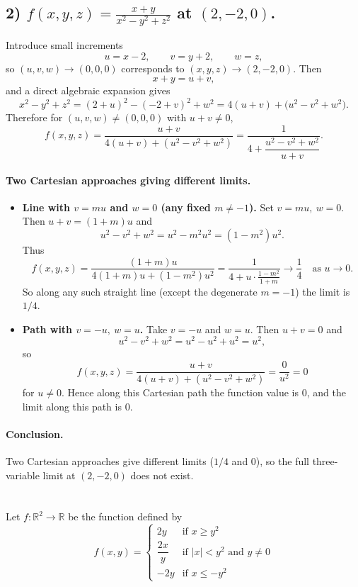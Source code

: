\documentclass[12pt]{article}
\begin{document}
\begin{correctionbox}
\subsection*{2) \(\displaystyle f(x,y,z)=\frac{x+y}{x^2-y^2+z^2}\) at \((2,-2,0)\).}

Introduce small increments
\[
u=x-2,\qquad v=y+2,\qquad w=z,
\]
so \((u,v,w)\to(0,0,0)\) corresponds to \((x,y,z)\to(2,-2,0)\). Then
\[
x+y = u+v,
\]
and a direct algebraic expansion gives
\[
x^2-y^2+z^2
= (2+u)^2 -(-2+v)^2 + w^2
= 4(u+v) + \big(u^2 - v^2 + w^2\big).
\]
Therefore for \((u,v,w)\neq(0,0,0)\) with \(u+v\neq0\),
\[
f(x,y,z)
= \frac{u+v}{4(u+v) + (u^2-v^2+w^2)}
= \frac{1}{4 + \dfrac{u^2-v^2+w^2}{\,u+v\,}}.
\]

\paragraph{Two Cartesian approaches giving different limits.}

\begin{itemize}
\item \textbf{Line with \(v=m u\) and \(w=0\) (any fixed \(m\neq-1\)).}  
Set \(v=mu,\ w=0\). Then \(u+v=(1+m)u\) and
\[
u^2-v^2+w^2 = u^2 - m^2u^2 = (1-m^2)u^2.
\]
Thus
\[
f(x,y,z)
= \frac{(1+m)u}{4(1+m)u + (1-m^2)u^2}
= \frac{1}{4 + u\cdot\frac{1-m^2}{1+m}}
\longrightarrow \frac{1}{4}
\quad\text{as }u\to0.
\]
So along any such straight line (except the degenerate \(m=-1\)) the limit is \(1/4\).

\item \textbf{Path with \(v=-u,\ w=u\).}  
Take \(v=-u\) and \(w=u\). Then \(u+v=0\) and
\[
u^2-v^2+w^2 = u^2 - u^2 + u^2 = u^2,
\]
so
\[
f(x,y,z)=\frac{u+v}{4(u+v)+ (u^2-v^2+w^2)}=\frac{0}{u^2}=0
\]
for \(u\neq0\). Hence along this Cartesian path the function value is \(0\), and the limit along this path is \(0\).
\end{itemize}

\paragraph{Conclusion.} Two Cartesian approaches give different limits (\(1/4\) and \(0\)), so the full three-variable limit at \((2,-2,0)\) does not exist.
\end{correctionbox}

\section{}
Let $f : \mathbb{R}^2 \to \mathbb{R}$ be the function defined by
$$f(x, y) = \begin{cases}
2y & \text{if } x \geq y^2 \\[0.5em]
\dfrac{2x}{y} & \text{if } |x| < y^2 \text{ and } y \neq 0 \\[0.5em]
-2y & \text{if } x \leq -y^2
\end{cases}$$
\end{document}
